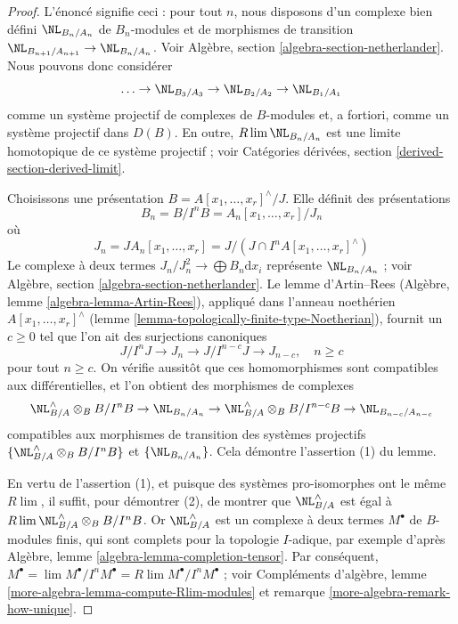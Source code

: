 \begin{proof}
L'énoncé signifie ceci : pour tout $n$, nous disposons d'un complexe bien
défini $\NL_{B_n/A_n}$ de $B_n$-modules et de morphismes de transition
$\NL_{B_{n + 1}/A_{n + 1}} \to \NL_{B_n/A_n}$. Voir Algèbre, section
\ref{algebra-section-netherlander}. Nous pouvons donc considérer
$$
\ldots \to \NL_{B_3/A_3} \to \NL_{B_2/A_2} \to \NL_{B_1/A_1}
$$
comme un système projectif de complexes de $B$-modules et, a fortiori, comme
un système projectif dans $D(B)$. En outre, $R\lim \NL_{B_n/A_n}$ est une
limite homotopique de ce système projectif ; voir Catégories dérivées, section
\ref{derived-section-derived-limit}.

\medskip\noindent
Choisissons une présentation $B = A[x_1, \ldots, x_r]^\wedge / J$. Elle
définit des présentations
$$
B_n = B/I^nB = A_n[x_1, \ldots, x_r]/J_n
$$
où
$$
J_n = JA_n[x_1, \ldots, x_r] =
J/(J \cap I^nA[x_1, \ldots, x_r]^\wedge)
$$
Le complexe à deux termes
$J_n/J_n^2 \longrightarrow \bigoplus B_n \text{d}x_i$ représente
$\NL_{B_n/A_n}$ ; voir Algèbre, section
\ref{algebra-section-netherlander}. Le lemme d'Artin--Rees (Algèbre, lemme
\ref{algebra-lemma-Artin-Rees}), appliqué dans l'anneau noethérien
$A[x_1, \ldots, x_r]^\wedge$ (lemme
\ref{lemma-topologically-finite-type-Noetherian}), fournit un $c \geq 0$ tel
que l'on ait des surjections canoniques
$$
J/I^nJ \to J_n \to J/I^{n - c}J \to J_{n - c},\quad n \geq c
$$
pour tout $n \geq c$. On vérifie aussitôt que ces homomorphismes sont
compatibles aux différentielles, et l'on obtient des morphismes de complexes
$$
\NL_{B/A}^\wedge \otimes_B B/I^nB \to
\NL_{B_n/A_n} \to
\NL_{B/A}^\wedge \otimes_B B/I^{n - c}B \to
\NL_{B_{n - c}/A_{n - c}}
$$
compatibles aux morphismes de transition des systèmes projectifs
$\{\NL_{B/A}^\wedge \otimes_B B/I^nB\}$ et $\{\NL_{B_n/A_n}\}$. Cela
démontre l'assertion (1) du lemme.

\medskip\noindent
En vertu de l'assertion (1), et puisque des systèmes pro-isomorphes ont le même
$R\lim$, il suffit, pour démontrer (2), de montrer que
$\NL_{B/A}^\wedge$ est égal à
$R\lim \NL_{B/A}^\wedge \otimes_B B/I^nB$. Or $\NL_{B/A}^\wedge$ est un
complexe à deux termes $M^\bullet$ de $B$-modules finis, qui sont complets pour
la topologie $I$-adique, par exemple d'après Algèbre, lemme
\ref{algebra-lemma-completion-tensor}. Par conséquent,
$M^\bullet = \lim M^\bullet/I^nM^\bullet = R\lim M^\bullet/I^n M^\bullet$ ; voir
Compléments d'algèbre, lemme \ref{more-algebra-lemma-compute-Rlim-modules} et
remarque \ref{more-algebra-remark-how-unique}.
\end{proof}

